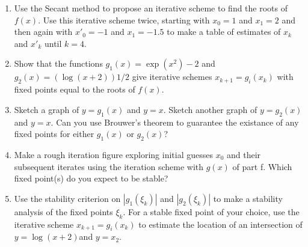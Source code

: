 {\begin{enumerate}[label=\alph*)]
	\item Use the Secant method to propose an iterative scheme to find the roots of $f(x)$. Use this iterative scheme twice, starting with $x_0=1$ and $x_1=2$ and then again with $x'_0=-1$ and $x_1=-1.5$ to make a table of estimates of $x_k$ and $x'_k$ until $k=4$.
	
	\item Show that the functions $g_1(x)=\exp(x^2)-2$ and $g_2(x)=( \log(x+2) )1/2$ give iterative schemes $x_{k+1} = g_i(x_k)$ with fixed points equal to the roots of $f(x)$.
	
	\item Sketch a graph of $y=g_1(x)$ and $y=x$. Sketch another graph of $y=g_2(x)$ and $y=x$. Can you use Brouwer's theorem to guarantee the existance of any fixed points for either $g_1(x)$ or $g_2(x)$?
	
	\item Make a rough iteration figure exploring initial guesses $x_0$ and their subsequent iterates using the iteration scheme with $g(x)$ of part f. Which fixed point(s) do you expect to be stable?
	
	\item Use the stability criterion on $|g_1(\xi_k)|$ and $|g_2(\xi_k)|$ to make a stability analysis of the fixed points $\xi_k$. For a stable fixed point of your choice, use the iterative scheme $x_{k+1}=g_i(x_k)$ to estimate the location of an intersection of $y=\log(x+2) $and $y=x_2$.
\end{enumerate}
}